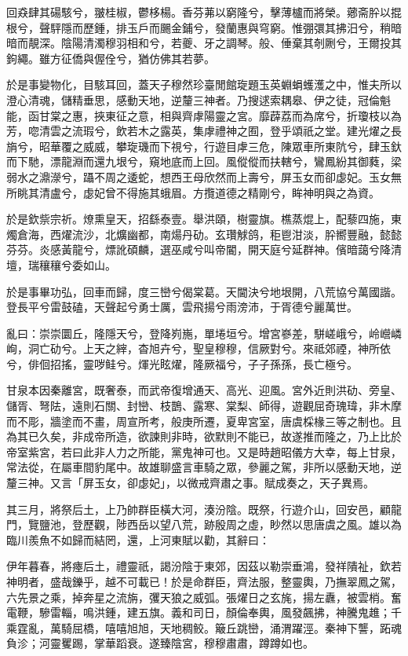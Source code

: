\begin{pinyinscope}
回猋肆其碭駭兮，翍桂椒，鬱栘楊。香芬茀以窮隆兮，擊薄櫨而將榮。薌斋肸以掍根兮，聲駍隱而歷鍾，排玉戶而颺金鋪兮，發蘭惠與穹窮。惟弸彋其拂汨兮，稍暗暗而靚深。陰陽清濁穆羽相和兮，若夔、牙之調琴。般、倕棄其剞劂兮，王爾投其鉤繩。雖方征僑與偓佺兮，猶仿佛其若夢。

於是事變物化，目駭耳回，蓋天子穆然珍臺閒館琁題玉英蜵蜎蠖濩之中，惟夫所以澄心清魂，儲精垂思，感動天地，逆釐三神者。乃搜逑索耦皋、伊之徒，冠倫魁能，函甘棠之惠，挾東征之意，相與齊虖陽靈之宮。靡薜荔而為席兮，折瓊枝以為芳，唿清雲之流瑕兮，飲若木之露英，集虖禮神之囿，登乎頌祇之堂。建光燿之長旓兮，昭華覆之威威，攀琁璣而下視兮，行遊目虖三危，陳眾車所東阬兮，肆玉釱而下馳，漂龍淵而還九垠兮，窺地底而上回。風傱傱而扶轄兮，鸞鳳紛其御蕤，梁弱水之濎濴兮，躡不周之逶蛇，想西王母欣然而上壽兮，屏玉女而卻虙妃。玉女無所眺其清盧兮，虙妃曾不得施其蛾眉。方攬道德之精剛兮，眸神明與之為資。

於是欽祡宗祈。燎熏皇天，招繇泰壹。舉洪頤，樹靈旗。樵蒸焜上，配藜四施，東燭倉海，西燿流沙，北爌幽都，南煬丹劯。玄瓚觩鸽，秬鬯泔淡，肸嚮豐融，懿懿芬芬。炎感黃龍兮，熛訛碩麟，選巫咸兮叫帝閽，開天庭兮延群神。儐暗藹兮降清壇，瑞穰穰兮委如山。

於是事畢功弘，回車而歸，度三巒兮偈棠葛。天閫決兮地垠開，八荒協兮萬國諧。登長平兮雷鼓磕，天聲起兮勇士厲，雲飛揚兮雨滂沛，于胥德兮麗萬世。

亂曰：崇崇圜丘，隆隱天兮，登降峛崺，單埢垣兮。增宮嵾差，駢嵯峨兮，岭巆嶙峋，洞亡劯兮。上天之縡，杳旭卉兮，聖皇穆穆，信厥對兮。來祗郊禋，神所依兮，俳佪招搖，靈哕鲑兮。煇光眩燿，隆厥福兮，子子孫孫，長亡極兮。

甘泉本因秦離宮，既奢泰，而武帝復增通天、高光、迎風。宮外近則洪劯、旁皇、儲胥、弩阹，遠則石關、封巒、枝鵲、露寒、棠梨、師得，遊觀屈奇瑰瑋，非木摩而不彫，牆塗而不畫，周宣所考，般庚所遷，夏卑宮室，唐虞棌椽三等之制也。且為其已久矣，非成帝所造，欲諫則非時，欲默則不能已，故遂推而隆之，乃上比於帝室紫宮，若曰此非人力之所能，黨鬼神可也。又是時趙昭儀方大幸，每上甘泉，常法從，在屬車間豹尾中。故雄聊盛言車騎之眾，參麗之駕，非所以感動天地，逆釐三神。又言「屏玉女，卻虙妃」，以微戒齊肅之事。賦成奏之，天子異焉。

其三月，將祭后土，上乃帥群臣橫大河，湊汾陰。既祭，行遊介山，回安邑，顧龍門，覽鹽池，登歷觀，陟西岳以望八荒，跡殷周之虛，眇然以思唐虞之風。雄以為臨川羨魚不如歸而結罔，還，上河東賦以勸，其辭曰：

伊年暮春，將瘞后土，禮靈祇，謁汾陰于東郊，因茲以勒崇垂鴻，發祥隤祉，欽若神明者，盛哉鑠乎，越不可載已！於是命群臣，齊法服，整靈輿，乃撫翠鳳之駕，六先景之乘，掉奔星之流旃，彏天狼之威弧。張燿日之玄旄，揚左纛，被雲梢。奮電鞭，驂雷輜，鳴洪鍾，建五旗。義和司日，顏倫奉輿，風發飆拂，神騰鬼趡；千乘霆亂，萬騎屈橋，嘻嘻旭旭，天地稠鲛。簸丘跳巒，涌渭躍涇。秦神下讋，跖魂負沴；河靈矍踢，掌華蹈衰。遂臻陰宮，穆穆肅肅，蹲蹲如也。


\end{pinyinscope}
